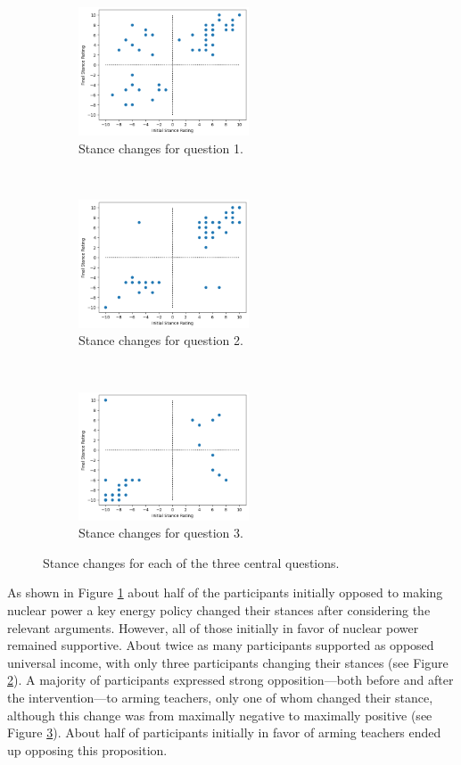 \documentclass[journal]{IEEEtran}
\begin{document}
\begin{figure}[t!]
    \centering
    \begin{subfigure}[t]{0.3\textwidth}
        \centering
        \includegraphics[height=1.5in]{Fig/topic_1_stance_changes.png}
        \caption{Stance changes for question 1.}
        \label{graph:stance-changes-1}
    \end{subfigure}%
    ~
    \begin{subfigure}[t]{0.3\textwidth}
        \centering
        \includegraphics[height=1.5in]{Fig/topic_2_stance_changes.png}
        \caption{Stance changes for question 2.}
        \label{graph:stance-changes-2}
    \end{subfigure}%
    ~
    \begin{subfigure}[t]{0.3\textwidth}
        \centering
        \includegraphics[height=1.5in]{Fig/topic_3_stance_changes.png}
        \caption{Stance changes for question 3.}
        \label{graph:stance-changes-3}
    \end{subfigure}%
    \caption{Stance changes for each of the three central questions.}
    \label{graph:stance-changes-all}
\end{figure}

As shown in Figure \ref{graph:stance-changes-1} about half of the participants initially opposed to making nuclear power a key energy policy changed their stances after considering the relevant arguments. However, all of those initially in favor of nuclear power remained supportive. About twice as many participants supported as opposed universal income, with only three participants changing their stances (see Figure \ref{graph:stance-changes-2}).  A majority of participants expressed strong opposition---both before and after the intervention---to arming teachers, only one of whom changed their stance, although this change was from maximally negative to maximally positive (see Figure \ref{graph:stance-changes-3}). About half of participants initially in favor of arming teachers ended up opposing this proposition.
\end{document}
